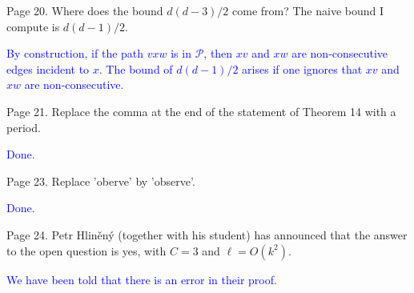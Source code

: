 \documentclass[12pt]{article}
\newcommand{\done}{\textcolor{blue}{Done.}}
\begin{document}
Page 20.  Where does the bound $d(d-3)/2$ come from?  The naive bound I
compute is $d(d-1)/2$.

\textcolor{blue}{By construction, if the path $vxw$ is in $\mathcal{P}$, then $xv$ and $xw$ are non-consecutive edges incident to $x$. The bound of $d(d-1)/2$ arises if one ignores that $xv$ and $xw$ are non-consecutive.}


Page 21.  Replace the comma at the end of the statement of Theorem 14
with a period.

\done

Page 23. Replace 'oberve' by 'observe'.

\done

Page 24. Petr Hliněný (together with his student) has announced that
the answer to the open question is yes, with $C=3$ and $\ell=O(k^2)$.

\textcolor{blue}{We have been told that there is an error in their proof.}
\end{document}
